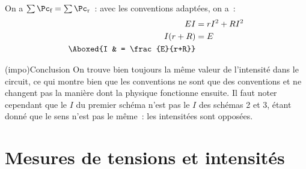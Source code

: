 \documentclass[../../main/main.tex]{subfiles}
\begin{document}
{\begin{tcbraster}[raster columns=7, raster equal height=rows]
\begin{tcb}[raster multicolumn=3]
        \subsubsection{}
        On a $\sum \Pc_{\text{f}} = \sum \Pc_{\text{r}}$~: avec les
        conventions adaptées, on a~:
        \begin{align*}
            EI        & = rI^2 + RI^2\\
            I(r+R)    & = E\\
            \Aboxed{I & = \frac{E}{r+R}}
        \end{align*}
    \end{tcb}
\end{tcbraster}
\begin{center}
    \begin{tcb}[width=\linewidth](impo){Conclusion}
        On trouve bien toujours la même valeur de l'intensité dans le circuit,
        ce qui montre bien que les conventions ne sont que des conventions et ne
        changent pas la manière dont la physique fonctionne ensuite. Il faut
        noter cependant que le $I$ du premier schéma n'est pas le $I$ des
        schémas 2 et 3, étant donné que le sens n'est pas le même~: les
        intensitées sont opposées.
    \end{tcb}
\end{center}
}

\section{Mesures de tensions et intensités}
\end{document}
